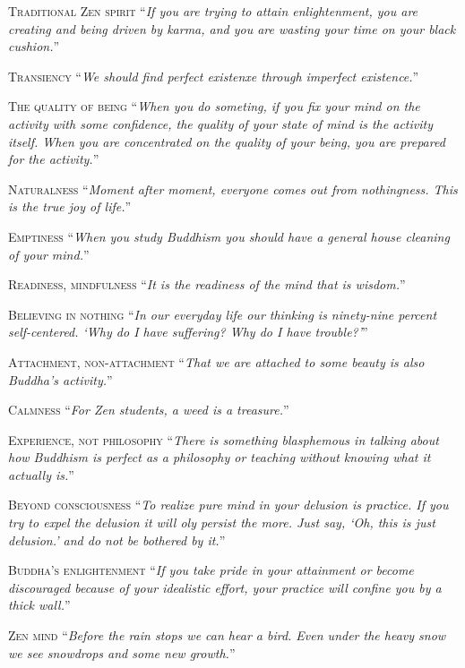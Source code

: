 \documentclass[14pt]{extarticle}
\newcommand{\aphor}[2]{
    \lettrine[lines=2, lraise=0.15]{#1}{#2}
}
\begin{document}
\aphor{T}{raditional Zen spirit} \enquote{\textit{If you are trying to attain enlightenment, you are creating and being driven by karma, and you are wasting your time on your black cushion.}}

\aphor{T}{ransiency} \enquote{\textit{We should find perfect existenxe through imperfect existence.}}

\aphor{T}{he quality of being} \enquote{\textit{When you do someting, if you fix your mind on the activity with some confidence, the quality of your state of mind is the activity itself. When you are concentrated on the quality of your being, you are prepared for the activity.}}

\pagebreak

\aphor{N}{aturalness} \enquote{\textit{Moment after moment, everyone comes out from nothingness. This is the true joy of life.}}

\aphor{E}{mptiness} \enquote{\textit{When you study Buddhism you should have a general house cleaning of your mind.}}

\aphor{R}{eadiness, mindfulness} \enquote{\textit{It is the readiness of the mind that is wisdom.}}

\aphor{B}{elieving in nothing} \enquote{\textit{In our everyday life our thinking is ninety-nine percent self-centered. \enquote{Why do I have suffering? Why do I have trouble?}}}

\aphor{A}{ttachment, non-attachment} \enquote{\textit{That we are attached to some beauty is also Buddha's activity.}}

\aphor{C}{almness} \enquote{\textit{For Zen students, a weed is a treasure.}}

\aphor{E}{xperience, not philosophy} \enquote{\textit{There is something blasphemous in talking about how Buddhism is perfect as a philosophy or teaching without knowing what it actually is.}}

\aphor{B}{eyond consciousness} \enquote{\textit{To realize pure mind in your delusion is practice. If you try to expel the delusion it will oly persist the more. Just say, \enquote{Oh, this is just delusion.} and do not be bothered by it.}}

\aphor{B}{uddha's enlightenment} \enquote{\textit{If you take pride in your attainment or become discouraged because of your idealistic effort, your practice will confine you by a thick wall.}}

\aphor{Z}{en mind} \enquote{\textit{Before the rain stops we can hear a bird. Even under the heavy snow we see snowdrops and some new growth.}}
\end{document}
